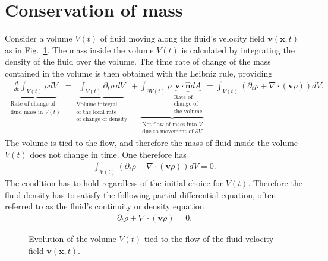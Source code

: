 \section{Conservation of mass}
Consider a volume $V(t)$ of fluid moving along the fluid's velocity field $\bm{v}(\bm{x},t)$ as in Fig.~\ref{fig:mass-volume}. The mass inside the volume $V(t)$ is calculated by integrating the density of the fluid over the volume. The time rate of change of the mass contained in the volume is then obtained with the Leibniz rule, providing
\begin{align}
    \underbrace{\frac{d}{dt}\int_{V(t)}\rho dV}_{\substack{\text{Rate of change of}\\\text{fluid mass in $V(t)$}}}=\underbrace{\int_{V(t)}\partial_t\rho \,dV}_{\substack{\text{Volume integral}\\\text{of the local rate}\\\text{of change of density}}}+\underbrace{\int_{\partial V(t)}\rho\underbrace{\bm{v}\cdot\bm{\hat{n}}dA}_{\substack{\text{Rate of}\\\text{change of}\\\text{the volume}}}}_{\substack{\text{Net flow of mass into $V$}\\\text{due to movement of $\partial V$}}}=\int_{V(t)}\left(\partial_t\rho+\nabla\cdot(\bm{v}\rho)\right)dV.
\end{align}
The volume is tied to the flow, and therefore the mass of fluid inside the volume $V(t)$ does not change in time. One therefore has
\begin{align}
    \int_{V(t)}\left(\partial_t\rho+\nabla\cdot(\bm{v}\rho)\right)dV=0.
\end{align}
The condition has to hold regardless of the initial choice for $V(t)$. Therefore the fluid density has to satisfy the following partial differential equation, often referred to as the fluid's continuity or density equation
\begin{align}\label{eq:density}
    \partial_t\rho+\nabla\cdot(\bm{v}\rho)=0.
\end{align}
\begin{figure}[!htb]
    \centering
    
    \caption{Evolution of the volume $V(t)$ tied to the flow of the fluid velocity field $\bm{v}(\bm{x},t)$.}
    \label{fig:mass-volume}
\end{figure}
